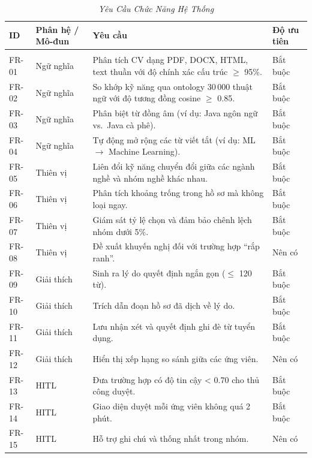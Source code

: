 \documentclass{article}
\begin{document}
\begin{longtable}{|
  >{\raggedright\arraybackslash}p{}|
  >{\raggedright\arraybackslash}p{}|
  >{\raggedright\arraybackslash}p{}|
  >{\raggedright\arraybackslash}p{}|}
  \hline
  \textbf{ID} & \textbf{Phân hệ / Mô-đun} & \textbf{Yêu cầu} & \textbf{Độ ưu tiên} \\
  \hline
  \endfirsthead

  \endhead

  \hline
  \endfoot

  \hline
  \caption{\centering\textit{Yêu Cầu Chức Năng Hệ Thống}}
  \label{tab:functional-requirements} \\
  \endlastfoot

    FR-01 & Ngữ nghĩa & Phân tích CV dạng PDF, DOCX, HTML, text thuần với độ chính xác cấu trúc $\ge$ 95\%. & Bắt buộc \\ \hline
    FR-02 & Ngữ nghĩa & So khớp kỹ năng qua ontology 30\,000 thuật ngữ với độ tương đồng cosine $\ge$ 0.85. & Bắt buộc \\ \hline
    FR-03 & Ngữ nghĩa & Phân biệt từ đồng âm (ví dụ: Java ngôn ngữ vs.\ Java cà phê). & Bắt buộc \\ \hline
    FR-04 & Ngữ nghĩa & Tự động mở rộng các từ viết tắt (ví dụ: ML $\rightarrow$ Machine Learning). & Bắt buộc \\ \hline
    FR-05 & Thiên vị & Liên đổi kỹ năng chuyển đổi giữa các ngành nghề và nhóm nghề khác nhau. & Bắt buộc \\ \hline
    FR-06 & Thiên vị & Phân tích khoảng trống trong hồ sơ mà không loại ngay. & Bắt buộc \\ \hline
    FR-07 & Thiên vị & Giám sát tỷ lệ chọn và đảm bảo chênh lệch nhóm dưới 5\%. & Bắt buộc \\ \hline
    FR-08 & Thiên vị & Đề xuất khuyến nghị đối với trường hợp ``rắp ranh''. & Nên có \\ \hline
    FR-09 & Giải thích & Sinh ra lý do quyết định ngắn gọn ($\le$ 120 từ). & Bắt buộc \\ \hline
    FR-10 & Giải thích & Trích dẫn đoạn hồ sơ đã dịch về lý do. & Bắt buộc \\ \hline
    FR-11 & Giải thích & Lưu nhận xét và quyết định ghi đè từ tuyển dụng. & Bắt buộc \\ \hline
    FR-12 & Giải thích & Hiển thị xếp hạng so sánh giữa các ứng viên. & Nên có \\ \hline
    FR-13 & HITL & Đưa trường hợp có độ tin cậy \textless{} 0.70 cho thủ công duyệt. & Bắt buộc \\ \hline
    FR-14 & HITL & Giao diện duyệt mỗi ứng viên không quá 2 phút. & Bắt buộc \\ \hline
    FR-15 & HITL & Hỗ trợ ghi chú và thống nhất trong nhóm. & Nên có \\

\end{longtable}
\end{document}
